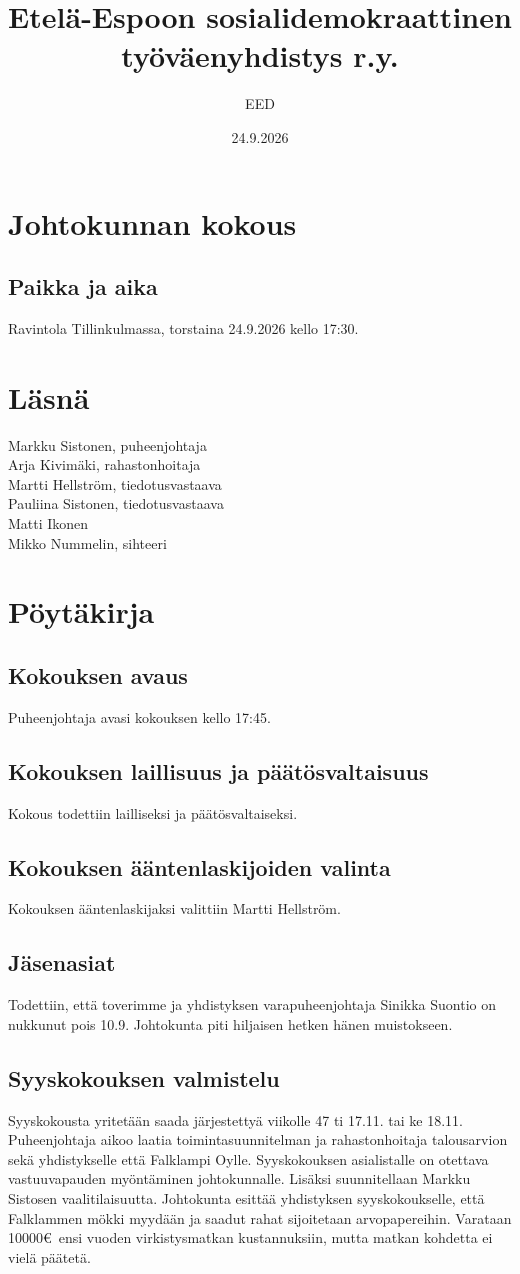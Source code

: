 \documentclass[a4paper,12pt]{article}
\title{Etelä-Espoon sosialidemokraattinen työväenyhdistys r.y.}
\author{EED}
\date{24.9.2026}
\begin{document}
\maketitle
\tableofcontents
\section*{Johtokunnan kokous}
\subsection*{Paikka ja aika}
Ravintola Tillinkulmassa, torstaina 24.9.2026 kello 17:30.
\section*{Läsnä}
Markku Sistonen, puheenjohtaja \\
Arja Kivimäki, rahastonhoitaja \\
Martti Hellström, tiedotusvastaava \\
Pauliina Sistonen, tiedotusvastaava \\
Matti Ikonen \\
Mikko Nummelin, sihteeri
\section*{Pöytäkirja}
\subsection{Kokouksen avaus}
Puheenjohtaja avasi kokouksen kello 17:45.
\subsection{Kokouksen laillisuus ja päätösvaltaisuus}
Kokous todettiin lailliseksi ja päätösvaltaiseksi.
\subsection{Kokouksen ääntenlaskijoiden valinta}
Kokouksen ääntenlaskijaksi valittiin Martti Hellström.
\subsection{Jäsenasiat}
Todettiin, että toverimme ja yhdistyksen varapuheenjohtaja Sinikka Suontio on nukkunut pois 10.9. Johtokunta piti hiljaisen hetken hänen muistokseen.
\subsection{Syyskokouksen valmistelu}
Syyskokousta yritetään saada järjestettyä viikolle 47 ti 17.11. tai ke 18.11. Puheenjohtaja aikoo laatia toimintasuunnitelman ja rahastonhoitaja talousarvion sekä yhdistykselle että Falklampi Oylle. Syyskokouksen asialistalle on otettava vastuuvapauden myöntäminen johtokunnalle. Lisäksi suunnitellaan Markku Sistosen vaalitilaisuutta. Johtokunta esittää yhdistyksen syyskokoukselle, että Falklammen mökki myydään ja saadut rahat sijoitetaan arvopapereihin. Varataan 10000\euro\ ensi vuoden virkistysmatkan kustannuksiin, mutta matkan kohdetta ei vielä päätetä.
\end{document}

